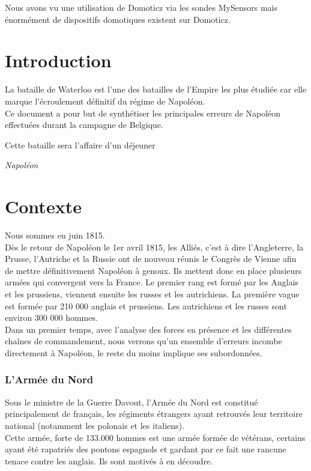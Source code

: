 Nous avons vu une utilisation de Domoticz via les sondes MySensors mais énormément de dispositifs domotiques existent sur Domoticz.\newcommand{\wel}{Wellington~}



\chapter{Introduction}

La bataille de Waterloo est l'une des batailles de l'Empire les plus étudiée car elle marque l'écroulement 
définitif du régime de Napoléon. \\
Ce document a pour but de synthétiser les principales erreurs de Napoléon effectuées durant la campagne 
de Belgique.


\epigraph{Cette bataille sera l'affaire d'un déjeuner}{\textit{Napoléon}}

\chapter{Contexte}



Nous sommes en juin 1815.\\
Dès le retour de Napoléon le 1er avril 1815, les Alliés, c'est à dire l'Angleterre, la Prusse, 
l'Autriche et la Russie ont de nouveau réunis le Congrès de Vienne afin de mettre définitivement 
Napoléon à genoux. Ils mettent donc en place plusieurs armées qui convergent vers la France. 
Le premier rang est formé par les Anglais et les prussiens, viennent ensuite les russes et les autrichiens.
La première vague est formée par 210 000 anglais et prussiens.
Les autrichiens et les russes sont environ 300 000 hommes.\\

Dans un premier temps, avec l'analyse des forces en présence et les différentes chaînes de commandement, nous verrons qu'un ensemble d'erreurs incombe directement à Napoléon, le reste du moins implique ses subordonnées.\\

\subsection{L'Armée du Nord}

Sous le ministre de la Guerre Davout, l'Armée du Nord est constitué principalement de français, 
les régiments étrangers ayant retrouvés leur territoire national (notamment les polonais et les italiens). \\
Cette armée, forte de 133.000 hommes est une armée formée de vétérans, certains ayant été rapatriés des 
pontons espagnols et gardant par ce fait une rancune tenace contre les anglais. 
Ils sont motivés à en découdre.\\


